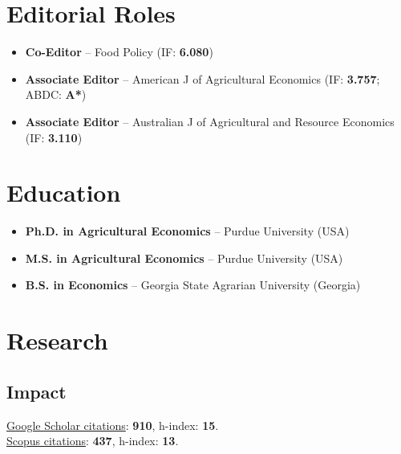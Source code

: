 \documentclass[10pt]{article}
\begin{document}
	\section*{Editorial Roles}
	\begin{itemize}
		\item {} \textbf{Co-Editor} -- Food Policy (IF: \textbf{6.080})
		\item {} \textbf{Associate Editor} -- American J of Agricultural Economics (IF: \textbf{3.757}; ABDC: \textbf{A*})
		\item {} \textbf{Associate Editor} -- Australian J of Agricultural and Resource Economics (IF: \textbf{3.110})
	\end{itemize}
	
	\section*{Education}
	\begin{itemize}
		\item {} \textbf{Ph.D. in Agricultural Economics} -- Purdue University (USA)
		\item {} \textbf{M.S. in Agricultural Economics} -- Purdue University (USA)
		\item {} \textbf{B.S. in Economics} -- Georgia State Agrarian University (Georgia)
	\end{itemize}
	
	\section*{Research}
	
	\subsection*{Impact}
	\href{https://scholar.google.com/citations?user=VbNOr6wAAAAJ&hl=en}{Google Scholar citations}: \textbf{910}, h-index: \textbf{15}.\\	
	\href{https://www.scopus.com/authid/detail.uri?authorId=26421832000}{Scopus citations}: \textbf{437}, h-index: \textbf{13}.	
	
	\begin{refsection}[papers]
		\nocite{ubilava2022ajae,ferguson2022,ubilava2022agec,hastings2022,angus2021,atalay2021,ubilava2019el,ubilava2019erl,ubilava2019md,ubilava2018ajae,smith2017gec,ubilava2017wd,tack2015agec,ubilava2014erae,tack2013cc,ubilava2013ems,ubilava2013ajare,ubilava2012agec,ubilava2012agri,ubilava2011jare,ubilava2011jcb,ubilava2010tfsc,ubilava2009fp}
		\printbibliography[heading={articles}]
	\end{refsection}
	\begin{refsection}[papers]
		\nocite{rice_enso,conflict_seasia}
		\printbibliography[heading={papers}]
	\end{refsection}
	
\end{document}
